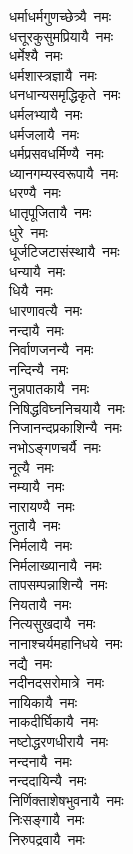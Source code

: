 \begin{multicols}{\maxColumns}
\begin{flushleft}
धर्माधर्मगुणच्छेत्र्यै~नमः\\
धत्तूरकुसुमप्रियायै~नमः\\
धर्मेश्यै~नमः\\
धर्मशास्त्रज्ञायै~नमः\\
धनधान्यसमृद्धिकृते~नमः\hfill{}\\
धर्मलभ्यायै~नमः\\
धर्मजलायै~नमः\\
धर्मप्रसवधर्मिण्यै~नमः\\
ध्यानगम्यस्वरूपायै~नमः\\
धरण्यै~नमः\\
धातृपूजितायै~नमः\\
धुरे~नमः\\
धूर्जटिजटासंस्थायै~नमः\\
धन्यायै~नमः\\
धियै~नमः\hfill{}\\
धारणावत्यै~नमः\\
नन्दायै~नमः\\
निर्वाणजनन्यै~नमः\\
नन्दिन्यै~नमः\\
नुन्नपातकायै~नमः\\
निषिद्धविघ्ननिचयायै~नमः\\
निजानन्दप्रकाशिन्यै~नमः\\
नभोऽङ्गणचर्यै~नमः\\
नूत्यै~नमः\\
नम्यायै~नमः\hfill{}\\
नारायण्यै~नमः\\
नुतायै~नमः\\
निर्मलायै~नमः\\
निर्मलाख्यानायै~नमः\\
तापसम्पन्नाशिन्यै~नमः\\
नियतायै~नमः\\
नित्यसुखदायै~नमः\\
नानाश्चर्यमहानिधये~नमः\\
नद्यै~नमः\\
नदीनदसरोमात्रे~नमः\hfill{}\\
नायिकायै~नमः\\
नाकदीर्घिकायै~नमः\\
नष्टोद्धरणधीरायै~नमः\\
नन्दनायै~नमः\\
नन्ददायिन्यै~नमः\\
निर्णिक्ताशेषभुवनायै~नमः\\
निःसङ्गायै~नमः\\
निरुपद्रवायै~नमः\\

\end{flushleft}
\end{multicols}
